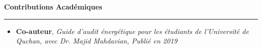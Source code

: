 \documentclass[a4paper]{letter}
\newcommand{\divider}{\rule{\linewidth}{0.9pt}}
\begin{document}
\begin{minipage}[t]{0.60\textwidth}
\vspace{3mm}

{\large \textbf{Contributions Académiques}}
\divider
\vspace{3mm}
\begin{itemize}
    \footnotesize \item {\textbf{Co-auteur}, \textit{Guide d’audit énergétique pour les étudiants de l’Université de Quchan, avec Dr. Majid Mahdavian, Publié en 2019}}


\end{itemize}


    

\end{minipage}
\end{document}
